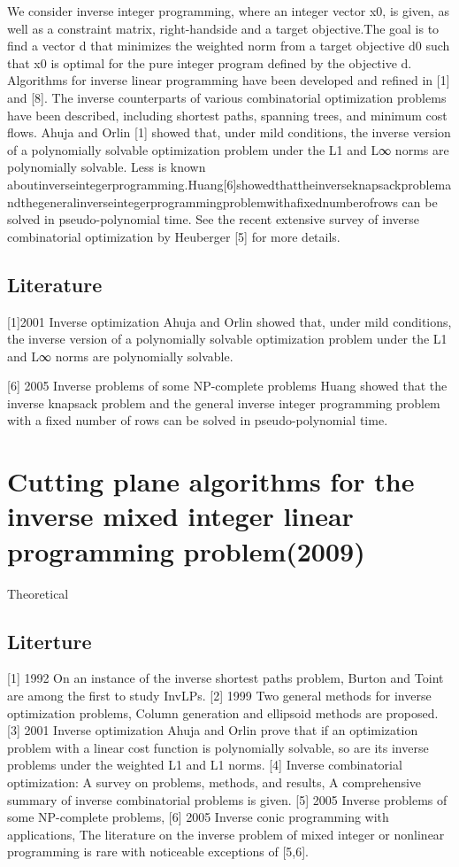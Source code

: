 \documentclass[UTF8]{article}
\begin{document}
We consider inverse integer programming, where an integer vector x0, is given, as well as a constraint matrix, right-handside and a target objective.The goal is to ﬁnd a vector d that minimizes the weighted norm from a target objective d0 such that x0 is optimal for the pure integer program deﬁned by the objective d. Algorithms for inverse linear programming have been developed and reﬁned in [1] and [8]. The inverse counterparts of various combinatorial optimization problems have been described, including shortest paths, spanning trees, and minimum cost flows. Ahuja and Orlin [1] showed that, under mild conditions, the inverse version of a polynomially solvable optimization problem under the L1 and L∞ norms are polynomially solvable. Less is known aboutinverseintegerprogramming.Huang[6]showedthattheinverseknapsackproblemandthegeneralinverseintegerprogrammingproblemwithaﬁxednumberofrows can be solved in pseudo-polynomial time. See the recent extensive survey of inverse combinatorial optimization by Heuberger [5] for more details.


\subsection{Literature}

[1]2001 Inverse optimization
Ahuja and Orlin  showed that, under mild conditions, the inverse version of a polynomially solvable optimization problem under the L1 and L∞ norms are polynomially solvable.

[6] 2005 Inverse problems of some NP-complete problems
 Huang showed that the inverse knapsack problem and the general inverse integer programming problem with a fixed number of rows can be solved in pseudo-polynomial time.





\section{Cutting plane algorithms for the inverse mixed integer linear programming problem(2009)}

Theoretical


\subsection{Literture}

[1] 1992 On an instance of the inverse shortest paths problem,
Burton and Toint are among the first to study InvLPs.
[2] 1999 Two general methods for inverse optimization problems,
 Column generation and ellipsoid methods are proposed.
[3] 2001 Inverse optimization
Ahuja and Orlin  prove that if an optimization problem with a linear cost function is polynomially solvable, so are its inverse problems under the weighted L1 and L1 norms. [4] Inverse combinatorial optimization: A survey on problems, methods, and results,
A comprehensive summary of inverse combinatorial problems is given.
[5] 2005 Inverse problems of some NP-complete problems,
[6] 2005 Inverse conic programming with applications,
The literature on the inverse problem of mixed integer or nonlinear programming is
rare with noticeable exceptions of [5,6].
\end{document}
